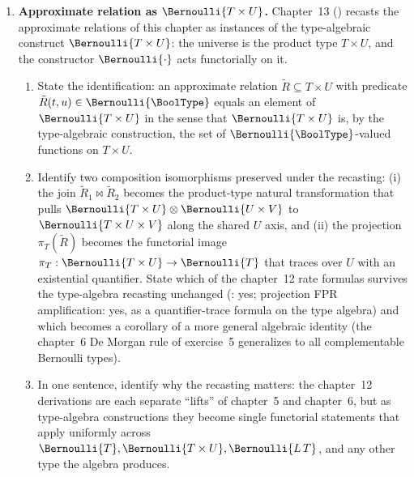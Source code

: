 \begin{enumerate}
\item \exstarstarstar
\label{ex:ch12-11}
\textbf{Approximate relation as $\Bernoulli{T \times U}$.}
Chapter~13 () recasts the approximate
relations of this chapter as instances of the type-algebraic
construct $\Bernoulli{T \times U}$: the universe is the product
type $T \times U$, and the constructor $\Bernoulli{\cdot}$ acts
functorially on it.
\begin{enumerate}
  \item[(a)] State the identification: an approximate relation
    $\tilde R \subseteq T \times U$ with predicate $\tilde R(t, u)
    \in \Bernoulli{\BoolType}$ equals an element of
    $\Bernoulli{T \times U}$ in the sense that
    $\Bernoulli{T \times U}$ is, by the type-algebraic
    construction, the set of $\Bernoulli{\BoolType}$-valued
    functions on $T \times U$.
  \item[(b)] Identify two composition isomorphisms preserved
    under the recasting: (i) the join $\tilde R_1 \bowtie
    \tilde R_2$ becomes the product-type natural transformation
    that pulls $\Bernoulli{T \times U} \otimes \Bernoulli{U
    \times V}$ to $\Bernoulli{T \times U \times V}$ along the
    shared $U$ axis, and (ii) the projection $\pi_T(\tilde R)$
    becomes the functorial image $\pi_T : \Bernoulli{T \times U}
    \to \Bernoulli{T}$ that traces over $U$ with an existential
    quantifier. State which of the chapter~12 rate formulas
    survives the type-algebra recasting unchanged
    (: yes; projection FPR amplification:
    yes, as a quantifier-trace formula on the type algebra) and
    which becomes a corollary of a more general algebraic
    identity (the chapter~6 De Morgan rule of exercise~5
    generalizes to all complementable Bernoulli types).
  \item[(c)] In one sentence, identify why the recasting matters:
    the chapter~12 derivations are each separate ``lifts'' of
    chapter~5 and chapter~6, but as type-algebra constructions
    they become single functorial statements that apply
    uniformly across $\Bernoulli{T}, \Bernoulli{T \times U},
    \Bernoulli{L\,T}$, and any other type the algebra produces.
\end{enumerate}

\end{enumerate}
